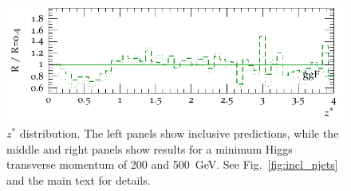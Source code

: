 \documentclass[10pt,prd,fleqn,superscriptaddress,notitlepage,nofootinbib,preprintnumbers,nobalancelastpage]{revtex4-1}
\begin{document}
\begin{figure}[p]
\begin{minipage}{.295\textwidth}
    \includegraphics[width=\textwidth]{figures/channels/z_star_pth500_rGGH.pdf}
  \end{minipage}
\caption{$z^*$ distribution.
The left panels show inclusive predictions, while the middle and right panels
show results for a minimum Higgs transverse momentum of 200 and 500~GeV.
See Fig.~\ref{fig:incl_njets} and the main text for details.}
\label{fig:incl_z_star}
\end{figure}
\end{document}
